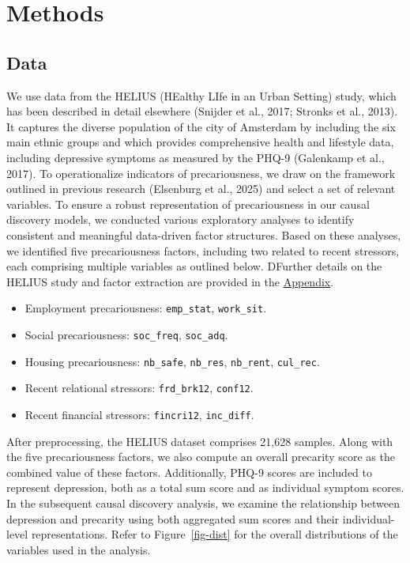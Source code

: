 \documentclass[
]{article}
\providecommand{\tightlist}{%
  \setlength{\itemsep}{0pt}\setlength{\parskip}{0pt}}\usepackage{longtable,booktabs,array}
\begin{document}
\section{Methods}\label{methods}

\subsection{Data}\label{data}

We use data from the HELIUS (HEalthy LIfe in an Urban Setting) study,
which has been described in detail elsewhere (Snijder et al., 2017;
Stronks et al., 2013). It captures the diverse population of the city of
Amsterdam by including the six main ethnic groups and which provides
comprehensive health and lifestyle data, including depressive symptoms
as measured by the PHQ-9 (Galenkamp et al., 2017). To operationalize
indicators of precariousness, we draw on the framework outlined in
previous research (Elsenburg et al., 2025) and select a set of relevant
variables. To ensure a robust representation of precariousness in our
causal discovery models, we conducted various exploratory analyses to
identify consistent and meaningful data-driven factor structures. Based
on these analyses, we identified five precariousness factors, including
two related to recent stressors, each comprising multiple variables as
outlined below. DFurther details on the HELIUS study and factor
extraction are provided in the \hyperref[sec-appendix]{Appendix}.

\begin{itemize}
\tightlist
\item
  Employment precariousness: \texttt{emp\_stat}, \texttt{work\_sit}.
\item
  Social precariousness: \texttt{soc\_freq}, \texttt{soc\_adq}.
\item
  Housing precariousness: \texttt{nb\_safe}, \texttt{nb\_res},
  \texttt{nb\_rent}, \texttt{cul\_rec}.
\item
  Recent relational stressors: \texttt{frd\_brk12}, \texttt{conf12}.
\item
  Recent financial stressors: \texttt{fincri12}, \texttt{inc\_diff}.
\end{itemize}

After preprocessing, the HELIUS dataset comprises 21,628 samples. Along
with the five precariousness factors, we also compute an overall
precarity score as the combined value of these factors. Additionally,
PHQ-9 scores are included to represent depression, both as a total sum
score and as individual symptom scores. In the subsequent causal
discovery analysis, we examine the relationship between depression and
precarity using both aggregated sum scores and their individual-level
representations. Refer to Figure~\ref{fig-dist} for the overall
distributions of the variables used in the analysis.
\end{document}
